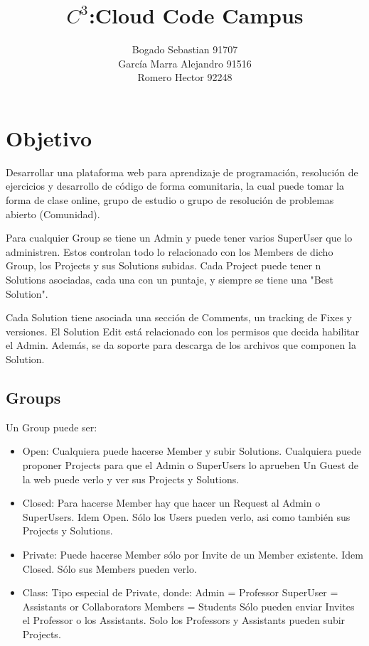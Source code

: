 \documentclass[a4paper,10pt]{article}
\title{$C^3$:Cloud Code Campus}
\author{Bogado Sebastian 	91707\\
García Marra Alejandro 	91516\\
Romero Hector 		92248}
\date{}
\begin{document}
\maketitle

 


\section{Objetivo}

Desarrollar una plataforma web para aprendizaje de programación, resolución de ejercicios y desarrollo de código de forma comunitaria, la cual puede tomar la forma de clase online, grupo de estudio o grupo de resolución de problemas abierto (Comunidad).

Para cualquier Group se tiene un Admin y puede tener varios SuperUser que lo administren. Estos controlan todo lo relacionado con los Members de dicho Group, los Projects y sus Solutions subidas. 
Cada Project puede tener n Solutions asociadas, cada una con un puntaje, y siempre se tiene una "Best Solution". 

Cada Solution tiene asociada una sección de Comments, un tracking de Fixes y versiones. El Solution Edit está relacionado con los permisos que decida habilitar el Admin. Además, se da soporte para descarga de los archivos que componen la Solution.

\subsection{Groups}

Un Group puede ser:
\begin{itemize}
 	\item Open:   Cualquiera puede hacerse Member y subir Solutions. 
		Cualquiera puede proponer Projects para que el Admin o SuperUsers lo aprueben
		Un Guest de la web puede verlo y ver sus Projects y Solutions.

	\item Closed: Para hacerse Member hay que hacer un Request al Admin o SuperUsers.
		Idem Open.
		Sólo los Users pueden verlo, asi como también sus Projects y Solutions.

	\item Private: Puede hacerse Member sólo por Invite de un Member existente.
		 Idem Closed.
		 Sólo sus Members pueden verlo.

	\item Class:  Tipo especial de Private, donde:
			Admin = Professor
			SuperUser = Assistants or Collaborators
			Members = Students
		Sólo pueden enviar Invites el Professor o los Assistants.
		Solo los Professors y Assistants pueden subir Projects.
\end{itemize}
\end{document}
